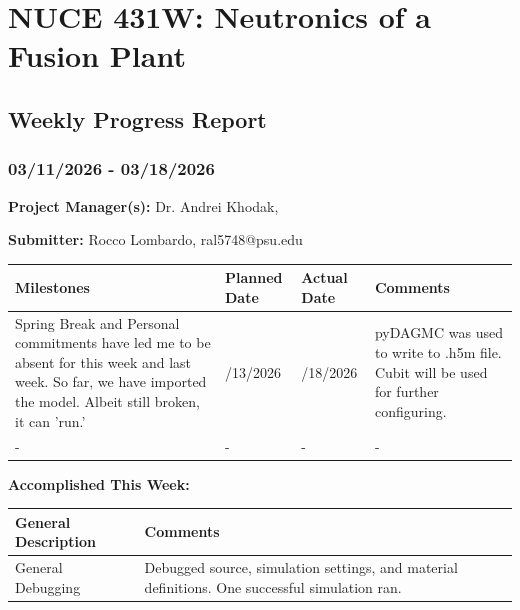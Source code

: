 \documentclass{article}
\begin{document}
{\centering \section*{NUCE 431W: Neutronics of a Fusion Plant}

\subsection*{Weekly Progress Report}

\subsubsection*{03/11/2026 - 03/18/2026}}


\hrulefill

\bigskip

\textbf{Project Manager(s):} Dr. Andrei Khodak,  

\bigskip

\textbf{Submitter:} Rocco Lombardo, ral5748@psu.edu

\bigskip

\renewcommand{\arraystretch}{1.5}
\begin{table}[H]
    \centering
    \begin{tabularx}{0.95\textwidth} { 
        | >{\centering\arraybackslash}X 
        | >{\centering\arraybackslash}X 
        | >{\centering\arraybackslash}X
        | >{\centering\arraybackslash}X | }

    \hline
    \textbf{Milestones} & \textbf{Planned Date} & \textbf{Actual Date} & \textbf{Comments} \\
    \hline
    Spring Break and Personal commitments have led me to be absent for this week and last week. So far, we have imported the model. Albeit still broken, it can 'run.'  & 03/13/2026 & 03/18/2026 & pyDAGMC was used to write to .h5m file. Cubit will be used for further configuring.  \\
    \hline
    - & - & - & - \\
    \hline
    \end{tabularx}
\end{table}

\bigskip

\textbf{Accomplished This Week: }

\renewcommand{\arraystretch}{1.5}
\begin{table}[H]
    \centering
    \begin{tabularx}{0.95\textwidth} { 
        | >{\centering\arraybackslash}X
        | >{\centering\arraybackslash}X | }

    \hline
    \textbf{General Description} & \textbf{Comments} \\
    \hline
    General Debugging  & Debugged source, simulation settings, and material definitions. One successful simulation ran. \\
    \hline
    \end{tabularx}
\end{table}
\end{document}
